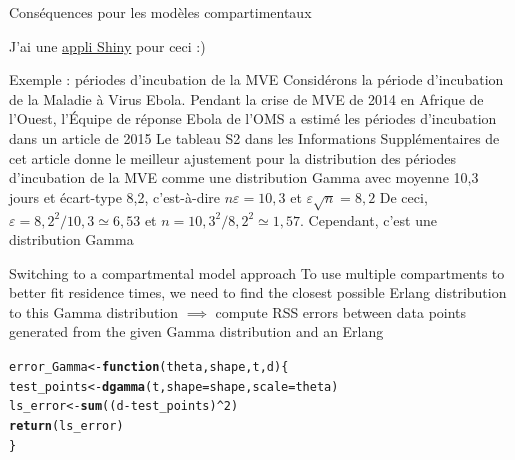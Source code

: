 \documentclass[aspectratio=169]{beamer}\usepackage[]{graphicx}\usepackage[]{xcolor}
\newcommand{\hlnum}[1]{\textcolor[rgb]{0.686,0.059,0.569}{#1}}%
\newcommand{\hlopt}[1]{\textcolor[rgb]{0,0,0}{#1}}%
\newcommand{\hldef}[1]{\textcolor[rgb]{0.345,0.345,0.345}{#1}}%
\newcommand{\hlkwa}[1]{\textcolor[rgb]{0.161,0.373,0.58}{\textbf{#1}}}%
\newcommand{\hlkwb}[1]{\textcolor[rgb]{0.69,0.353,0.396}{#1}}%
\newcommand{\hlkwc}[1]{\textcolor[rgb]{0.333,0.667,0.333}{#1}}%
\newcommand{\hlkwd}[1]{\textcolor[rgb]{0.737,0.353,0.396}{\textbf{#1}}}%
\newenvironment{knitrout}{}{} %
\begin{document}
\begin{frame}{Conséquences pour les modèles compartimentaux}
\begin{center}
\end{center}
\vfill
J'ai une \href{https://daytah-or-dahtah.ovh:3838/Erlang_shiny/}{appli Shiny} pour ceci :)
\end{frame}

\begin{frame}{Exemple : périodes d'incubation de la MVE}
Considérons la période d'incubation de la Maladie à Virus Ebola. Pendant la crise de MVE de 2014 en Afrique de l'Ouest, l'Équipe de réponse Ebola de l'OMS a estimé les périodes d'incubation dans un article de 2015
\vfill
Le tableau S2 dans les Informations Supplémentaires de cet article donne le meilleur ajustement pour la distribution des périodes d'incubation de la MVE comme une distribution Gamma avec moyenne 10,3 jours et écart-type 8,2, c'est-à-dire $n\varepsilon = 10,3$ et $\varepsilon \sqrt{n}=8,2$
\vfill
De ceci, $\varepsilon = 8,2^2/10,3 \simeq 6,53$ et $n = 10,3^2/8,2^2 \simeq 1,57$. Cependant, c'est une distribution Gamma
\end{frame}

\begin{frame}[fragile]{Switching to a compartmental model approach}
To use multiple compartments to better fit residence times, we need to find the closest possible Erlang distribution to this Gamma distribution
\vfill
$\implies$ compute RSS errors between data points generated from the given Gamma distribution and an Erlang
\vfill 
\begin{knitrout}
\color{fgcolor}
\begin{alltt}
\hldef{error_Gamma} \hlkwb{<-} \hlkwa{function}\hldef{(}\hlkwc{theta}\hldef{,}\hlkwc{shape}\hldef{,}\hlkwc{t}\hldef{,}\hlkwc{d}\hldef{) \{}
  \hldef{test_points} \hlkwb{<-} \hlkwd{dgamma}\hldef{(t,} \hlkwc{shape} \hldef{= shape,} \hlkwc{scale} \hldef{= theta)}
  \hldef{ls_error} \hlkwb{<-} \hlkwd{sum}\hldef{((d}\hlopt{-}\hldef{test_points)}\hlopt{^}\hlnum{2}\hldef{)}
  \hlkwd{return}\hldef{(ls_error)}
\hldef{\}}
\end{alltt}

\end{knitrout}

\end{frame}
\end{document}
